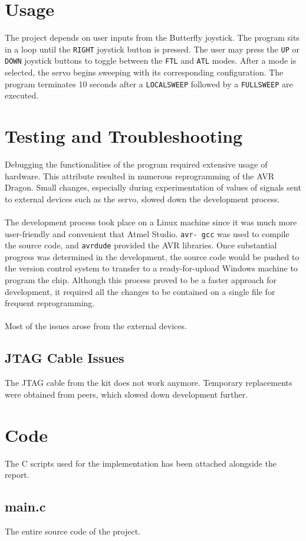 \documentclass[usletter, 12pt]{article}
\begin{document}
    \section{Usage} The project depends on user inputs from the Butterfly
    joystick. The program sits in a loop until the \texttt{RIGHT} joystick
    button is pressed. The user may press the \texttt{UP} or \texttt{DOWN}
    joystick buttons to toggle between the \texttt{FTL} and \texttt{ATL} modes.
    After a mode is selected, the servo begins sweeping with its corresponding
    configuration. The program terminates 10 seconds after a
    \texttt{LOCALSWEEP} followed by a \texttt{FULLSWEEP} are executed.

    \section{Testing and Troubleshooting} Debugging the functionalities of the
    program required extensive usage of hardware. This attribute resulted in
    numerous reprogramming of the AVR Dragon. Small changes, especially during
    experimentation of values of signals sent to external devices such as the
    servo, slowed down the development process. \\~\\
    \noindent The development process took place on a Linux machine since it
    was much more user-friendly and convenient that Atmel Studio. \texttt{avr-
    gcc} was used to compile the source code, and \texttt{avrdude} provided the
    AVR libraries. Once substantial progress was determined in the development,
    the source code would be pushed to the version control system to transfer
    to a ready-for-upload Windows machine to program the chip. Although this
    process proved to be a faster approach for development, it required all the
    changes to be contained on a single file for frequent reprogramming. \\~\\
    \noindent Most of the issues arose from the external devices.

        \subsection{JTAG Cable Issues} The JTAG cable from the kit does not
        work anymore. Temporary replacements were obtained from peers, which
        slowed down development further.

    \section{Code} The C scripts used for the implementation has been attached
    alongside the report.

        \subsection{main.c} The entire source code of the project.
\end{document}
